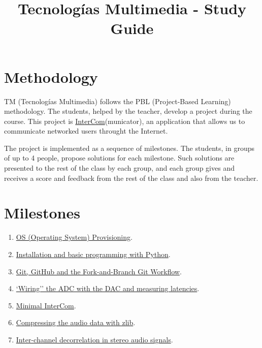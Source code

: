 \title{Tecnologías Multimedia - Study Guide}

\maketitle

\section{Methodology}
TM (Tecnologías Multimedia) follows the PBL (Project-Based Learning) methodology. The students,
helped by the teacher, develop a project during the course. This
project
is \href{https://github.com/Tecnologias-multimedia/intercom}{InterCom}(municator),
an application that allows us to communicate networked users throught
the Internet.

The project is implemented as a sequence of milestones. The students,
in groups of up to 4 people, propose solutions for each
milestone. Such solutions are presented to the rest of the class by
each group, and each group gives and receives a score and feedback
from the rest of the class and also from the teacher.

\section{Milestones}
\begin{enumerate}
\item \href{https://tecnologias-multimedia.github.io/study_guide/milestone00/}{OS (Operating System) Provisioning}.
\item \href{https://tecnologias-multimedia.github.io/study_guide/milestone01/}{Installation and basic programming with Python}.
\item \href{https://tecnologias-multimedia.github.io/study_guide/milestone02/}{Git, GitHub and the Fork-and-Branch Git Workflow}.
\item \href{https://tecnologias-multimedia.github.io/study_guide/milestone03/}{`Wiring'' the ADC with the DAC and measuring latencies}.
\item \href{https://tecnologias-multimedia.github.io/study_guide/milestone04/}{Minimal InterCom}.
\item \href{https://tecnologias-multimedia.github.io/study_guide/milestone06/}{Compressing the audio data with zlib}.
\item \href{https://tecnologias-multimedia.github.io/study_guide/milestone05/}{Inter-channel decorrelation in stereo audio signals}.
\end{enumerate}

